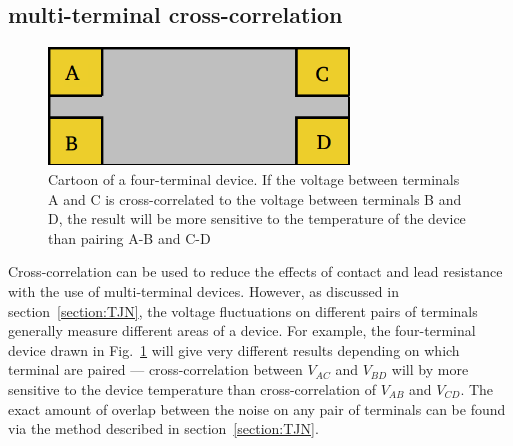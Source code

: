 \subsection{multi-terminal cross-correlation}
\begin{figure}
\centering
\includegraphics[width=80mm]{figures/Johnson_noise_thermometry/4terminal.png}
\caption{Cartoon of a four-terminal device. If the voltage between terminals A and C is cross-correlated to the voltage between terminals B and D, the result will be more sensitive to the temperature of the device than pairing A-B and C-D}
\label{fig:4terminal}
\end{figure}
Cross-correlation can be used to reduce the effects of contact and lead resistance with the use of multi-terminal devices. However, as discussed in section~\ref{section:TJN}, the voltage fluctuations on different pairs of terminals generally measure different areas of a device. For example, the four-terminal device drawn in Fig.~\ref{fig:4terminal} will give very different results depending on which terminal are paired --- cross-correlation between $V_{AC}$ and $V_{BD}$ will by more sensitive to the device temperature than cross-correlation of $V_{AB}$ and $V_{CD}$. The exact amount of overlap between the noise on any pair of terminals can be found via the method described in section~\ref{section:TJN}.


